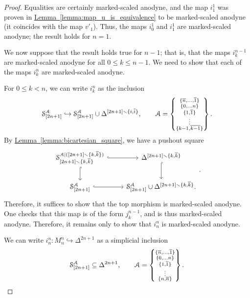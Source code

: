 \documentclass[main.tex]{subfiles}
\begin{document}
\begin{proof}
  Equalities are certainly marked-scaled anodyne, and the map $i^{1}_{1}$ was proven in \hyperref[lemma:map_u_is_equivalence]{Lemma~\ref*{lemma:map_u_is_equivalence}} to be marked-scaled anodyne (it coincides with the map $v'_{1}$). Thus, the maps $i^{1}_{0}$ and $i^{1}_{1}$ are marked-scaled anodyne; the result holds for $n = 1$.

  We now suppose that the result holds true for $n-1$; that is, that the maps $i^{n-1}_{k}$ are marked-scaled anodyne for all $0 \leq k \leq n-1$. We need to show that each of the maps $i^{n}_{k}$ are marked-scaled anodyne. 

  For $0 \leq k < n$, we can write $i^{n}_{k}$ as the inclusion
  \begin{equation*}
    \S^{\mathcal{A}}_{[2n+1]} \hookrightarrow \S^{\mathcal{A}}_{[2n+1]} \cup \Delta^{[2n+1] \smallsetminus \{i, \overline{i}\}},\qquad \mathcal{A}
    = \left\{ \substack{ \{\overline{n}, \ldots, \overline{1}\} \\ \{0, \ldots n\} \\ \{1, \overline{1}\} \\ \vdots \\ \{k-1, \overline{k-1}\} } \right\}.
  \end{equation*}
  By \hyperref[lemma:bicartesian_square]{Lemma~\ref*{lemma:bicartesian_square}}, we have a pushout square
  \begin{equation*}
    \begin{tikzcd}
      \S^{\mathcal{A}|([2n+1] \smallsetminus \{k, \overline{k}\})}_{[2n+1] \smallsetminus \{k, \overline{k}\}}
      \arrow[r, hook]
      \arrow[d, hook]
      & \Delta^{[2n+1] \smallsetminus \{k, \overline{k}\}}
      \arrow[d, hook]
      \\
      \S^{\mathcal{A}}_{[2n+1]}
      \arrow[r, hook]
      & \S^{\mathcal{A}}_{[2n+1]} \cup \Delta^{[2n+1] \smallsetminus \{k, \overline{k}\}}.
    \end{tikzcd}.
  \end{equation*}
  Therefore, it suffices to show that the top morphism is marked-scaled anodyne. One checks that this map is of the form $j^{n-1}_{k}$, and is thus marked-scaled anodyne. Therefore, it remains only to show that $i^{n}_{n}$ is marked-scaled anodyne.

  We can write $i^{n}_{n}\colon M^{n}_{n} \hookrightarrow \Delta^{2n+1}$ as a simplicial inclusion
  \begin{equation*}
    \S^{\mathcal{A}}_{[2n+1]} \subseteq \Delta^{2n+1},\qquad \mathcal{A} = \left\{ \substack{ \{\overline{n}, \ldots, \overline{1}\} \\ \{0, \ldots n\} \\ \{1, \overline{1}\} \\ \vdots \\ \{n, \overline{n}\} } \right\}.
  \end{equation*}


\end{proof}
\end{document}
